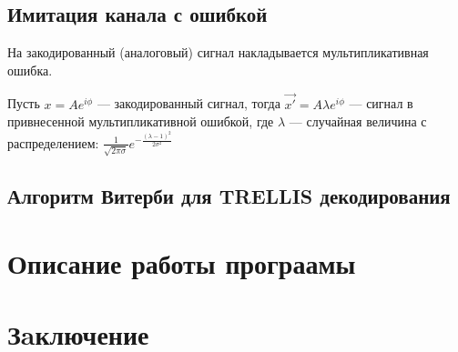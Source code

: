 \documentclass[a4paper,12pt]{article}
\begin{document}
\subsection{Имитация канала с ошибкой}
На закодированный (аналоговый) сигнал накладывается мультипликативная ошибка. 

Пусть $x = A e^{i\phi}$ --- закодированный сигнал, тогда $\vec{x'} = A\lambda e^{i\phi}$ --- сигнал в привнесенной
мультипликативной ошибкой, где $\lambda$ --- случайная величина с распределением: 
$\frac{1}{\sqrt{2\pi\sigma}}e^{-\frac{(\lambda - 1)^2}{2\sigma^2}}$

\subsection{Алгоритм Витерби для TRELLIS декодирования}

\section{Описание работы програамы}

\section{Зaключение}


\end{document}
